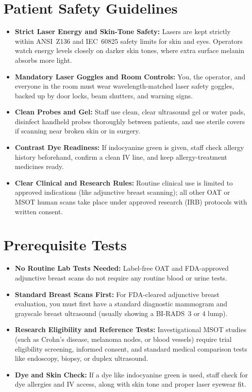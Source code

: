 \section{Patient Safety Guidelines}
\begin{itemize}
  \item \textbf{Strict Laser Energy and Skin-Tone Safety:} Lasers are kept strictly within ANSI~Z136 and IEC~60825 safety limits for skin and eyes. Operators watch energy levels closely on darker skin tones, where extra surface melanin absorbs more light.
  \item \textbf{Mandatory Laser Goggles and Room Controls:} You, the operator, and everyone in the room must wear wavelength-matched laser safety goggles, backed up by door locks, beam shutters, and warning signs.
  \item \textbf{Clean Probes and Gel:} Staff use clean, clear ultrasound gel or water pads, disinfect handheld probes thoroughly between patients, and use sterile covers if scanning near broken skin or in surgery.
  \item \textbf{Contrast Dye Readiness:} If indocyanine green is given, staff check allergy history beforehand, confirm a clean IV line, and keep allergy-treatment medicines ready.
  \item \textbf{Clear Clinical and Research Rules:} Routine clinical use is limited to approved indications (like adjunctive breast scanning); all other OAT or MSOT human scans take place under approved research (IRB) protocols with written consent.
\end{itemize}

\section{Prerequisite Tests}
\begin{itemize}
  \item \textbf{No Routine Lab Tests Needed:} Label-free OAT and FDA-approved adjunctive breast scans do not require any routine blood or urine tests.
  \item \textbf{Standard Breast Scans First:} For FDA-cleared adjunctive breast evaluation, you must first have a standard diagnostic mammogram and grayscale breast ultrasound (usually showing a BI-RADS~3 or 4 lump).
  \item \textbf{Research Eligibility and Reference Tests:} Investigational MSOT studies (such as Crohn's disease, melanoma nodes, or blood vessels) require trial eligibility screening, informed consent, and standard medical comparison tests like endoscopy, biopsy, or duplex ultrasound.
  \item \textbf{Dye and Skin Check:} If a dye like indocyanine green is used, staff check for dye allergies and IV access, along with skin tone and proper laser eyewear fit.
\end{itemize}

